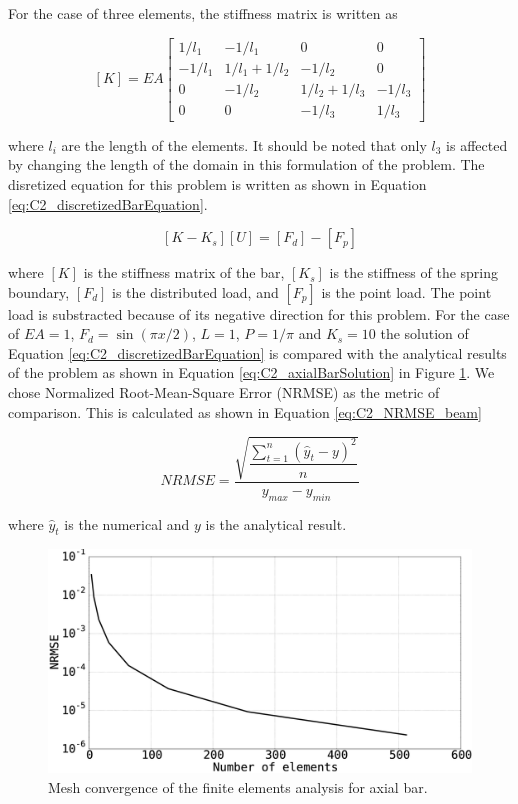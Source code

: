 For the case of three elements, the stiffness matrix is written as

\begin{equation}\label{eq:C2_stiffnessMatrixOfBar}
	[K] = 
	EA
	\begin{bmatrix}
	1/l_1 & -1/l_1 & 0 & 0 \\
	-1/l_1 & 1/l_1 + 1/l_2 & -1/l_2 & 0 \\
	0 & -1/l_2 & 1/l_2 + 1/l_3 & -1/l_3 \\
	0 & 0 & -1/l_3 & 1/l_3
	\end{bmatrix}
\end{equation}

where $l_i$ are the length of the elements. It should be noted that only $l_3$ is affected by changing the length of the domain in this formulation of the problem. The disretized equation for this problem is written as shown in Equation \eqref{eq:C2_discretizedBarEquation}.

\begin{equation}\label{eq:C2_discretizedBarEquation}
	[K - K_s] [U] = [F_d] - [F_p]
\end{equation}

where $[K]$ is the stiffness matrix of the bar, $[K_s]$ is the stiffness of the spring boundary, $[F_d]$ is the distributed load, and $[F_p]$ is the point load. The point load is substracted because of its negative direction for this problem. For the case of $EA = 1$, $F_d = \sin(\pi x / 2)$, $L = 1$, $P = 1 / \pi$ and $K_s = 10$ the solution of Equation \eqref{eq:C2_discretizedBarEquation} is compared with the analytical results of the problem as shown in Equation \eqref{eq:C2_axialBarSolution} in Figure \ref{fig:C2_axialBarSolution}. We chose Normalized Root-Mean-Square Error (NRMSE) as the metric of comparison. This is calculated as shown in Equation \eqref{eq:C2_NRMSE_beam}

\begin{equation}\label{eq:C2_NRMSE_beam}
	NRMSE = \dfrac{\sqrt{\dfrac{\sum_{t=1}^n \left( \hat{y}_t - y \right)^2}{n}}}{y_{max} - y_{min}}
\end{equation}

where $\hat{y}_t$ is the numerical and $y$ is the analytical result.

\begin{figure}[h]
	\centering
	\includegraphics[width=14.00cm]{Chapter_2/figure/axial_bar_governing_equation_mesh_convergence.eps}
	\caption{Mesh convergence of the finite elements analysis for axial bar.}
	\label{fig:C2_axialBarSolution}
\end{figure}

